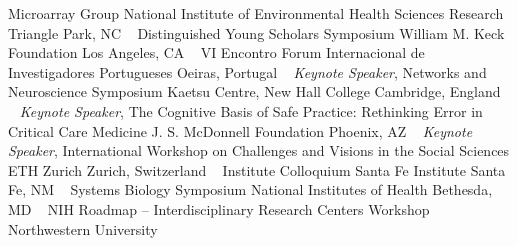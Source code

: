 Microarray Group
\newline
    National Institute of Environmental Health Sciences
    \newline
Research Triangle Park, NC
\newline
~
\Gap
{}
Distinguished Young Scholars Symposium
\newline
    William M. Keck Foundation
    \newline
Los Angeles, CA
\newline
~
\Gap
{}
VI Encontro
\newline
    Forum Internacional de Investigadores Portugueses
    \newline
Oeiras, Portugal
\newline
~
\Gap
{}
\textit{Keynote Speaker}, Networks and Neuroscience Symposium
\newline
    Kaetsu Centre, New Hall College
    \newline
Cambridge, England
\newline
~
\Gap
{}
\textit{Keynote Speaker}, The Cognitive Basis of Safe Practice: Rethinking Error in Critical Care Medicine
\newline
    J. S. McDonnell Foundation
    \newline
Phoenix, AZ
\newline
~
\Gap
{}
\textit{Keynote Speaker}, International Workshop on Challenges and Visions in the Social Sciences
\newline
    ETH Zurich
    \newline
Zurich, Switzerland
\newline
~
\Gap
{}
Institute Colloquium
\newline
    Santa Fe Institute
    \newline
Santa Fe, NM
\newline
~
\Gap
{}
Systems Biology Symposium
\newline
    National Institutes of Health
    \newline
Bethesda, MD
\newline
~
\Gap
{}
NIH Roadmap -- Interdisciplinary Research Centers Workshop
\newline
    Northwestern University
    \newline
